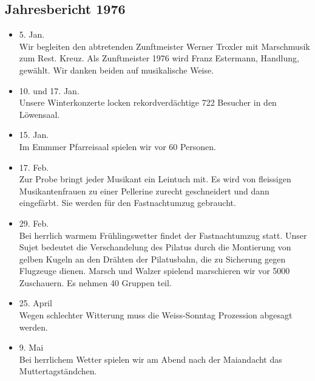 \subsection{Jahresbericht 1976}

\begin{history}


    \begin{itemize}

        \item[]5. Jan.\\
        Wir begleiten den abtretenden Zunftmeister Werner Troxler mit
        Marschmusik zum Rest. Kreuz. Als Zunftmeister 1976 wird Franz Estermann,
        Handlung, gewählt. Wir danken beiden auf musikalische Weise.

        \item[]10. und 17. Jan.\\
        Unsere Winterkonzerte locken rekordverdächtige 722 Besucher in den
        Löwensaal.

        \item[]15. Jan.\\
        Im Emmmer Pfarreisaal spielen wir vor 60 Personen.

        \item[]17. Feb.\\
        Zur Probe bringt jeder Musikant ein Leintuch mit. Es wird von fleissigen
        Musikantenfrauen zu einer Pellerine zurecht geschneidert und dann
        eingefärbt. Sie werden für den Fastnachtumzug gebraucht.

        \item[]29. Feb.\\
        Bei herrlich warmem Frühlingswetter findet der Fastnachtumzug statt.
        Unser Sujet bedeutet die Verschandelung des Pilatus durch die Montierung
        von gelben Kugeln an den Drähten der Pilatusbahn, die zu Sicherung gegen
        Flugzeuge dienen. Marsch und Walzer spielend marschieren wir vor 5000
        Zuschauern. Es nehmen 40 Gruppen teil.

        \item[]25. April\\
        Wegen schlechter Witterung muss die Weiss-Sonntag Prozession abgesagt
        werden.

        \item[]9. Mai\\
        Bei herrlichem Wetter spielen wir am Abend nach der Maiandacht das
        Muttertagständchen.


\end{itemize}
\end{history}
